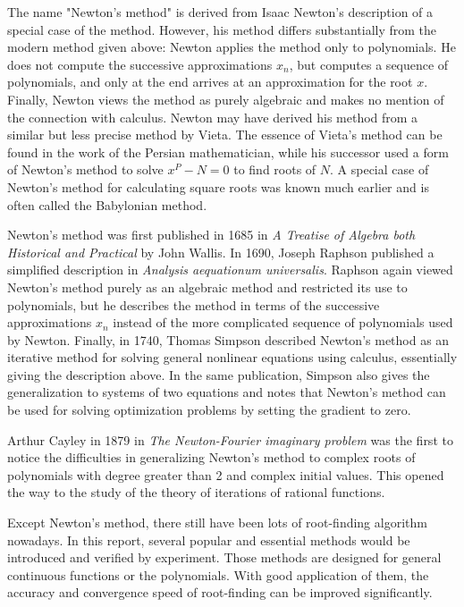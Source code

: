 \documentclass[preprint,12pt]{elsarticle}
\begin{document}
The name "Newton's method" is derived from Isaac Newton's description of a special case of the method. However, his method differs substantially from the modern method given above: Newton applies the method only to polynomials. He does not compute the successive approximations $x_n$, but computes a sequence of polynomials, and only at the end arrives at an approximation for the root $x$. Finally, Newton views the method as purely algebraic and makes no mention of the connection with calculus. Newton may have derived his method from a similar but less precise method by Vieta. The essence of Vieta's method can be found in the work of the Persian mathematician, while his successor used a form of Newton's method to solve $x^P-N=0$ to find roots of $N$. A special case of Newton's method for calculating square roots was known much earlier and is often called the Babylonian method.

Newton's method was first published in 1685 in \textit{A Treatise of Algebra both Historical and Practical} by John Wallis. In 1690, Joseph Raphson published a simplified description in \textit{Analysis aequationum universalis}. Raphson again viewed Newton's method purely as an algebraic method and restricted its use to polynomials, but he describes the method in terms of the successive approximations $x_n$ instead of the more complicated sequence of polynomials used by Newton. Finally, in 1740, Thomas Simpson described Newton's method as an iterative method for solving general nonlinear equations using calculus, essentially giving the description above. In the same publication, Simpson also gives the generalization to systems of two equations and notes that Newton's method can be used for solving optimization problems by setting the gradient to zero.

Arthur Cayley in 1879 in \textit{The Newton-Fourier imaginary problem} was the first to notice the difficulties in generalizing Newton's method to complex roots of polynomials with degree greater than 2 and complex initial values. This opened the way to the study of the theory of iterations of rational functions.

Except Newton's method, there still have been lots of root-finding algorithm nowadays. In this report, several popular and essential methods would be introduced and verified by experiment. Those methods are designed for general continuous functions or the polynomials. With good application of them, the accuracy and convergence speed of root-finding can be improved significantly.
\end{document}
